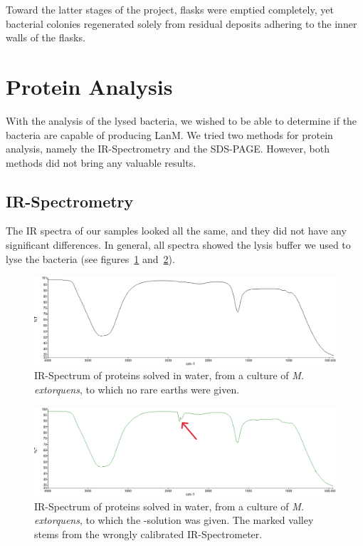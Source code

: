 Toward the latter stages of the project, flasks were emptied completely, yet bacterial colonies
regenerated solely from residual deposits adhering to the inner walls of the flasks.


\newpage

\section{Protein Analysis\authorA}

With the analysis of the lysed bacteria, we wished to be able to determine if the bacteria are capable of producing LanM.
We tried two methods for protein analysis, namely the IR-Spectrometry and the SDS-PAGE.
However, both methods did not bring any valuable results.


\subsection{IR-Spectrometry}

The IR spectra of our samples looked all the same, and they did not have any significant differences.
In general, all spectra showed the lysis buffer we used to lyse the bacteria (see figures~\ref{fig:ir_spectrum_2} and~\ref{fig:ir_spectrum_1}).

\begin{figure}[H]
    \centering
    \includegraphics[width=1\textwidth]{./media/images/ir_spectrum_2}
    \caption{IR-Spectrum of proteins solved in water, from a culture of \emph{M. extorquens}, to which no rare earths were given. }
    \label{fig:ir_spectrum_2}
\end{figure}

\begin{figure}[H]
    \centering
    \includegraphics[width=1\textwidth]{./media/images/ir_spectrum_1}
    \caption{IR-Spectrum of proteins solved in water, from a culture of \emph{M. extorquens}, to which the -solution was given. The marked valley stems from the wrongly calibrated IR-Spectrometer. }
    \label{fig:ir_spectrum_1}
\end{figure}

